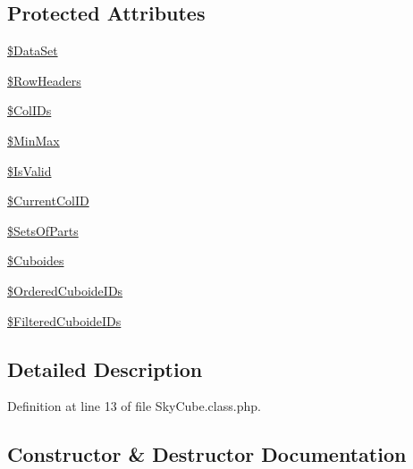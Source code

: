 \subsection*{Protected Attributes}
\begin{DoxyCompactItemize}
\item 
\hyperlink{class_sky_cube_a1ca406fe9bd295d4f75e5acc4c8a097c}{\$\+Data\+Set}
\item 
\hyperlink{class_sky_cube_a8cea387612952f4291a3f18d962834ce}{\$\+Row\+Headers}
\item 
\hyperlink{class_sky_cube_a7b6332fc8c2a70f63f999959d5f0b03a}{\$\+Col\+I\+Ds}
\item 
\hyperlink{class_sky_cube_a72e94f47d2fba9130ca1f468d93c85ae}{\$\+Min\+Max}
\item 
\hyperlink{class_sky_cube_a2a1f81c33966b049003c0fbc898cb51d}{\$\+Is\+Valid}
\item 
\hyperlink{class_sky_cube_aa5c86b2f23b58489a3e2e42c112904b7}{\$\+Current\+Col\+ID}
\item 
\hyperlink{class_sky_cube_aeae26ba6326acb0643320e03cb25d37d}{\$\+Sets\+Of\+Parts}
\item 
\hyperlink{class_sky_cube_a29a6af34afe03c9484470788644c09ae}{\$\+Cuboides}
\item 
\hyperlink{class_sky_cube_ae0988ad067bb0c954c74140b8cd34c67}{\$\+Ordered\+Cuboide\+I\+Ds}
\item 
\hyperlink{class_sky_cube_a52a9da29a47e5e8e434b82a7d3caaeeb}{\$\+Filtered\+Cuboide\+I\+Ds}
\end{DoxyCompactItemize}


\subsection{Detailed Description}


Definition at line 13 of file Sky\+Cube.\+class.\+php.



\subsection{Constructor \& Destructor Documentation}
\mbox{\label{class_sky_cube_aa93aeacd5389ce08890582667e987c65}} 
